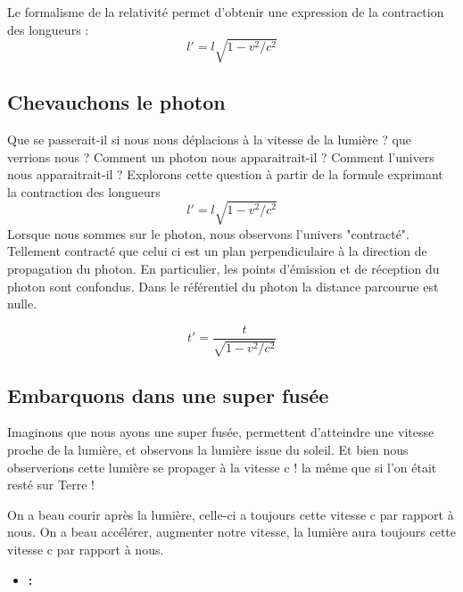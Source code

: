 Le formalisme de la relativité permet d'obtenir une expression de la contraction des longueurs : 
\[
l'=l\sqrt{1-v^2/c^2}
\]


\subsection{Chevauchons le photon}
Que se passerait-il si nous nous déplacions à la vitesse de la lumière ? que verrions nous ? Comment un photon nous apparaitrait-il ? Comment l'univers nous apparaitrait-il ? 
Explorons cette question à partir de la formule exprimant la contraction des longueurs
\[
l'=l\sqrt{1-v^2/c^2}
\]
Lorsque nous sommes sur le photon, nous observons l'univers "contracté". Tellement contracté que celui ci est un plan perpendiculaire à la direction de propagation du photon. En particulier, les points d'émission et de réception du photon sont confondus. Dans le référentiel du photon la distance parcourue est nulle.



\[
t' = \frac{t}{\sqrt{1-v^2/c^2}}
\]


\subsection{Embarquons dans une super fusée}

Imaginons que nous ayons une super fusée, permettent d'atteindre une vitesse proche de la lumière, et observons la lumière issue du soleil. Et bien nous observerions cette lumière se propager à la vitesse c ! la même que si l'on était resté sur Terre !

On a beau courir après la lumière, celle-ci a toujours cette vitesse c par rapport à nous. On a beau accélérer, augmenter notre vitesse, la lumière aura toujours cette vitesse c par rapport à nous.

\begin{itemize}[leftmargin=1cm, label=, itemsep=1pt]
\item {\bf :}
\end{itemize}

